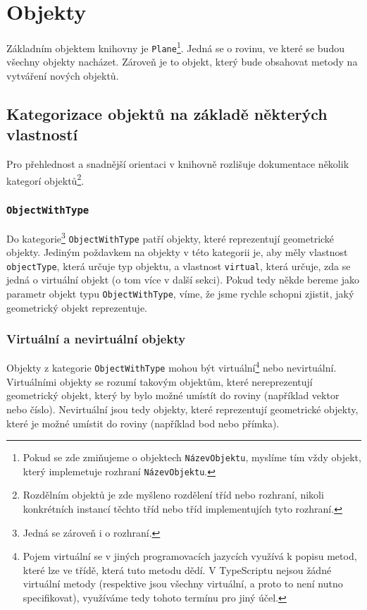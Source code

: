 \chapter{Objekty}
\label{chapter:objects}

Základním objektem knihovny je \texttt{Plane}\footnote{Pokud se zde zmiňujeme o objektech \texttt{NázevObjektu}, myslíme tím vždy objekt, který implemetuje rozhraní \texttt{NázevObjektu}.}\cite{geometryjs:source:interfaces:plane.ts}. 
Jedná se o rovinu, ve které se budou všechny objekty nacházet.
Zároveň je to objekt, který bude obsahovat metody na vytváření nových objektů\cite{geometryjs:wiki:geometryObjects}.

\section[Kategorizace]{Kategorizace objektů na základě některých vlastností}
\label{sec:object-categorization}

Pro přehlednost a snadnější orientaci v knihovně rozlišuje dokumentace několik kategorí objektů\footnote{Rozdělním objektů je zde myšleno rozdělení tříd nebo rozhraní, nikoli konkrétních instancí těchto tříd nebo tříd implementujích tyto rozhraní.}\cite{geometryjs:wiki:geometryObjects}.

\subsection[ObjectWithType]{\texttt{ObjectWithType}}
\label{subsec:object-with-type}

Do kategorie\footnote{Jedná se zároveň i o rozhraní.} \texttt{ObjectWithType} patří objekty, které reprezentují geometrické objekty. 
Jediným poždavkem na objekty v této kategorii je, aby měly vlastnost \texttt{objectType}, která určuje typ objektu, a vlastnost \texttt{virtual}, která určuje, zda se jedná o virtuální objekt (o tom více v další sekci).
Pokud tedy někde bereme jako parametr objekt typu \texttt{ObjectWithType}, víme, že jsme rychle schopni zjistit, jaký geometrický objekt reprezentuje.\cite[volný překlad]{geometryjs:wiki:geometryObjects}

\subsection[Virtuální a nevirtuální]{Virtuální a nevirtuální objekty}
\label{subsec:virtual-and-non-virtual}

Objekty z kategorie \texttt{ObjectWithType} mohou být virtuální\footnote{Pojem virtuální se v jiných programovacích jazycích využívá k popisu metod, které lze  ve třídě, která tuto metodu dědí. V TypeScriptu nejsou žádné virtuální metody (respektive jsou všechny virtuální, a proto to není nutno specifikovat), využíváme tedy tohoto termínu pro jiný účel.} nebo nevirtuální.
Virtuálními objekty se rozumí takovým objektům, které nereprezentují geometrický objekt, který by bylo možné umístít do roviny (například vektor nebo číslo).
Nevirtuální jsou tedy objekty, které reprezentují geometrické objekty, které je možné umístit do roviny (například bod nebo přímka).\cite[volný překlad]{geometryjs:wiki:geometryObjects}

